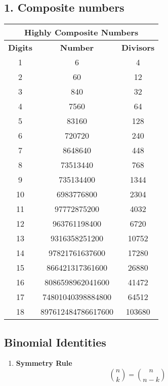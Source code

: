 \documentclass[twoside]{article}
\renewcommand{\arraystretch}{1.5} %
\newcommand{\mathstable}[3]{%
    \vspace{1em}%
    \bgroup%
    \def\arraystretch{#1}%
    \begin{center}%
        \begin{tabular}{#2}%
            #3%
        \end{tabular}%
    \end{center}%
    \egroup%
    \vspace{1em}%
}
\begin{document}
\begin{multicols*}{2}
{\subsection*{1. Composite numbers}
}
\mathstable{1.5}{|c|c|c|}{\hline
\multicolumn{3}{|c|}{Highly Composite Numbers} \\
\hline
\textbf{Digits} & \textbf{Number} & \textbf{Divisors} \\
\hline
1  & 6               & 4     \\
\hline
2  & 60              & 12    \\
\hline
3  & 840             & 32    \\
\hline
4  & 7560            & 64    \\
\hline
5  & 83160           & 128   \\
\hline
6  & 720720          & 240   \\
\hline
7  & 8648640         & 448   \\
\hline
8  & 73513440        & 768   \\
\hline
9  & 735134400       & 1344  \\
\hline
10 & 6983776800      & 2304  \\
\hline
11 & 97772875200     & 4032  \\
\hline
12 & 963761198400    & 6720  \\
\hline
13 & 9316358251200   & 10752 \\
\hline
14 & 97821761637600  & 17280 \\
\hline
15 & 866421317361600 & 26880 \\
\hline
16 & 8086598962041600 & 41472 \\
\hline
17 & 74801040398884800 & 64512 \\
\hline
18 & 897612484786617600 & 103680 \\
\hline
}

{
\subsection*{Binomial Identities}
}
\begin{enumerate}[leftmargin=*]
    \item \textbf{Symmetry Rule}
        \[\binom{n}{k} = \binom{n}{n - k}\]
    

\end{enumerate}
\end{multicols*}
\end{document}
